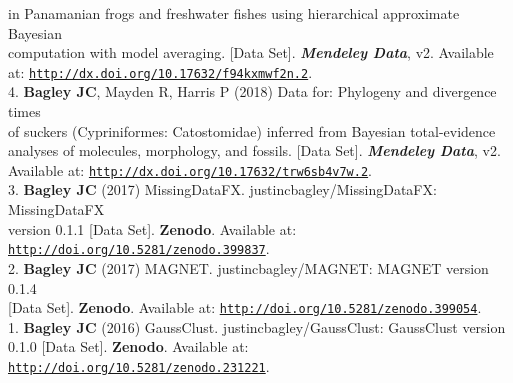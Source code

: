 \documentclass[margin,line]{res}
\begin{document}
\begin{resume}
\hspace*{8mm} in Panamanian frogs and freshwater fishes using hierarchical approximate Bayesian\\
\hspace*{8mm} computation with model averaging. [Data Set]. {\it \textbf{Mendeley Data}}, v2. Available\\ \vspace{2mm}
\hspace*{8mm}at: \href{http://dx.doi.org/10.17632/f94kxmwf2n.2}{\tt http://dx.doi.org/10.17632/f94kxmwf2n.2}. \\
4. \textbf{Bagley JC}, Mayden R, Harris P (2018) Data for: Phylogeny and divergence times\\
\hspace*{8mm} of suckers (Cypriniformes: Catostomidae) inferred from Bayesian total-evidence\\
\hspace*{8mm} analyses of molecules, morphology, and fossils. [Data Set]. {\it \textbf{Mendeley Data}}, v2.\\ \vspace{2mm}
\hspace*{8mm}Available at: \href{http://dx.doi.org/10.17632/trw6sb4v7w.2}{\tt http://dx.doi.org/10.17632/trw6sb4v7w.2}. \\
3. \textbf{Bagley JC} (2017) MissingDataFX. justincbagley/MissingDataFX: MissingDataFX\\
\hspace*{8mm} version 0.1.1 [Data Set]. \textbf{Zenodo}. Available at:\\  \vspace{2mm}
\hspace*{8mm}\href{http://doi.org/10.5281/zenodo.399837}{\tt http://doi.org/10.5281/zenodo.399837}. \\
2. \textbf{Bagley JC} (2017) MAGNET. justincbagley/MAGNET: MAGNET version 0.1.4\\ \vspace{2mm}
\hspace*{8mm}[Data Set]. \textbf{Zenodo}. Available at: \href{http://doi.org/10.5281/zenodo.399054}{\tt http://doi.org/10.5281/zenodo.399054}. \\
1. \textbf{Bagley JC} (2016) GaussClust. justincbagley/GaussClust: GaussClust version\\
\hspace*{8mm} 0.1.0 [Data Set]. \textbf{Zenodo}. Available at: \href{http://doi.org/10.5281/zenodo.231221}{\tt http://doi.org/10.5281/zenodo.231221}.



\end{resume}
\end{document}
